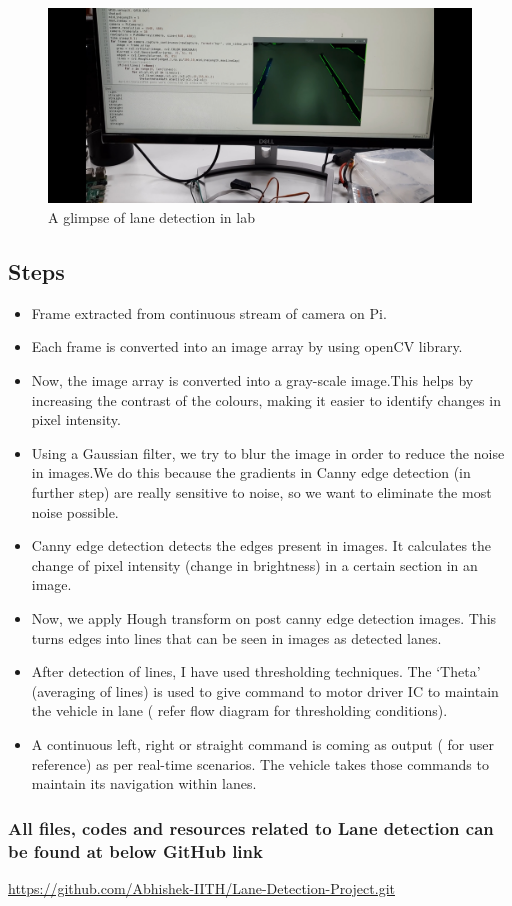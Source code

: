 \begin{figure}[h!]
\centering
\includegraphics[width=\columnwidth]{./Figures/actual_lane_detection.jpg}
\caption{A glimpse of lane detection in lab}
\label{actual_lane_detection}
\end{figure}

\subsection{Steps}
\begin{itemize}
    \item Frame extracted from continuous stream of camera on Pi.
    \item Each frame is converted into an image array by using openCV library.
    \item Now, the image array is converted into a gray-scale image.This helps by increasing the contrast of the colours, making it easier to identify changes in pixel intensity.
    \item Using a Gaussian filter, we try to blur the image in order to reduce the noise in images.We do this because the gradients in Canny edge detection (in further step) are really sensitive to noise, so we want to eliminate the most noise possible.
    \item Canny edge detection detects the edges present in images. It calculates the change of pixel intensity (change in brightness) in a certain section in an image. 
    \item Now, we apply Hough transform on post canny edge detection images. This turns edges into lines that can be seen in images as detected lanes.
    \item After detection of lines, I have used thresholding techniques. The ‘Theta’ (averaging of lines) is used to give command to motor driver IC to maintain the vehicle in lane ( refer flow diagram for thresholding conditions).
    \item A continuous left, right or straight command is coming as output ( for user reference) as per real-time scenarios. The vehicle takes those commands to maintain its navigation within lanes.
\end{itemize}



\subsubsection{All files, codes and resources related to Lane detection can be found at below GitHub link} 
\begin{tcolorbox}
        \url{https://github.com/Abhishek-IITH/Lane-Detection-Project.git}
\end{tcolorbox}